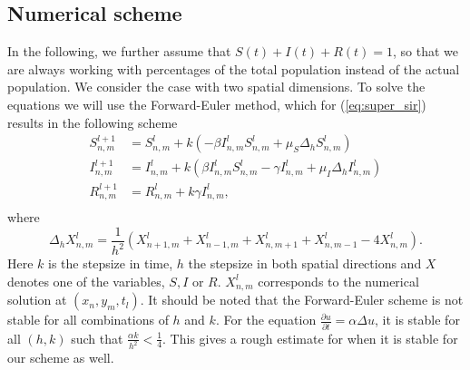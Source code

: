 \subsection{Numerical scheme}
In the following, we further assume that $S(t) + I(t) + R(t) = 1$, so that we are always working with percentages of the total population instead of the actual population.
We consider the case with two spatial dimensions.
To solve the equations we will use the Forward-Euler method, which for (\ref{eq:super_sir}) results in the following scheme
\begin{equation}
    \begin{split}
        S_{n,m}^{l+1} &= S_{n,m}^l + k(-\beta I_{n,m}^l S_{n,m}^l + \mu_S \Delta_h S_{n,m}^l) \\
        I_{n,m}^{l+1} &= I_{n,m}^l + k(\beta I_{n,m}^l S_{n,m}^l - \gamma I_{n,m}^l +  \mu_I \Delta_h I_{n,m}^l) \\
        R_{n,m}^{l+1} &= R_{n,m}^l + k \gamma I_{n,m}^l,  \\
    \end{split}
    \label{eq:SIR-numerical}
\end{equation}
where
\begin{equation*}
    \Delta_h X_{n,m}^l = \frac{1}{h^2}(X_{n+1, m}^l + X_{n-1, m}^l + X_{n, m+1}^l + X_{n, m-1}^l - 4X_{n,m}^l).
\end{equation*}
Here $k$ is the stepsize in time, $h$ the stepsize in both spatial directions and $X$ denotes one of the variables, $S, I$ or $R$. 
$X_{n,m}^l$ corresponds to the numerical solution at $(x_n,y_m,t_l)$. It should be noted that the Forward-Euler scheme is
not stable for all combinations of $h$ and $k$. For the equation $\frac{\partial u}{\partial t} = \alpha \Delta u$, it is stable for all $(h,k)$
such that $\frac{\alpha k}{h^2} < \frac{1}{4}$. This gives a rough estimate for when it is stable for our scheme as well.

